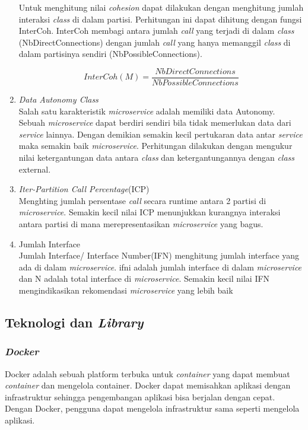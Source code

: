 \begin{enumerate}[leftmargin=1.3cm]
	Untuk menghitung nilai \textit{cohesion} dapat dilakukan dengan menghitung jumlah interaksi \textit{class} di dalam partisi. Perhitungan ini dapat dihitung dengan fungsi InterCoh. InterCoh membagi antara jumlah \textit{call} yang terjadi di dalam \textit{class} (NbDirectConnections) dengan jumlah \textit{call} yang hanya memanggil \textit{class} di dalam partisinya sendiri (NbPossibleConnections).
	
	\begin{equation}
		I n t e r C o h(M)=\frac{N b D i r e c t C o n n e c t i o n s}{N b P o s s i b l e C o n n e c t i o n s}
		\label{eq:interCoh}
	\end{equation}
	
	\item \textit{Data Autonomy Class} \cite{5B1}\\
	Salah satu karakteristik \textit{microservice} adalah memiliki data Autonomy. Sebuah \textit{microservice} dapat berdiri sendiri bila tidak memerlukan data dari \textit{service} lainnya. Dengan demikian semakin kecil pertukaran data antar \textit{service} maka semakin baik \textit{microservice}. Perhitungan dilakukan dengan mengukur nilai ketergantungan data antara \textit{class} dan ketergantungannya dengan \textit{class} external.
	
	\item \textit{Iter-Partition Call Percentage}(ICP) \cite{ECD} \\
	Menghting jumlah persentase \textit{call} secara runtime antara 2 partisi di \textit{microservice}. Semakin kecil nilai ICP menunjukkan kurangnya interaksi antara partisi di mana merepresentasikan \textit{microservice} yang bagus.	
	
	\item Jumlah Interface \cite{ECD} \\
	Jumlah Interface/ Interface Number(IFN) menghitung jumlah interface yang ada di dalam \textit{microservice}. ifni adalah jumlah interface di dalam \textit{microservice} dan N adalah total interface di \textit{microservice}. Semakin kecil nilai IFN mengindikasikan rekomendasi \textit{microservice} yang lebih baik\\


\end{enumerate}	

\subsection{Teknologi dan \textit{Library}}
\subsubsection{\textit{Docker} \cite{docker}}
Docker adalah sebuah platform terbuka untuk \textit{container} yang dapat membuat \textit{container} dan mengelola container. Docker dapat memisahkan aplikasi dengan infrastruktur sehingga pengembangan aplikasi bisa berjalan dengan cepat. Dengan Docker, pengguna dapat mengelola infrastruktur sama seperti mengelola aplikasi.

